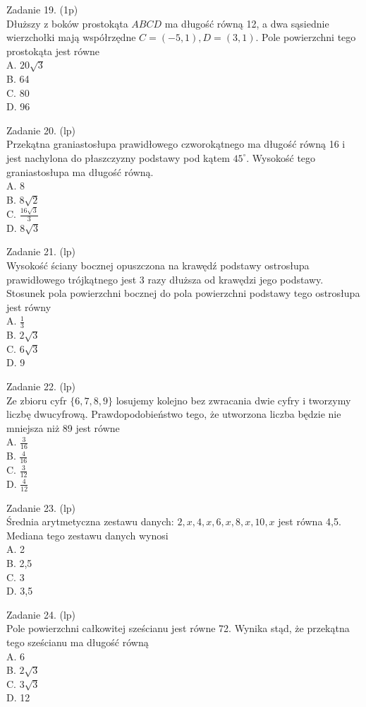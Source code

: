 \documentclass[10pt]{article}
\begin{document}
Zadanie 19. (1p)\\
Dłuższy z boków prostokąta \(A B C D\) ma długość równą 12, a dwa sąsiednie wierzchołki mają współrzędne \(C=(-5,1), D=(3,1)\). Pole powierzchni tego prostokąta jest równe\\
A. \(20 \sqrt{3}\)\\
B. 64\\
C. 80\\
D. 96

Zadanie 20. (lp)\\
Przekątna graniastosłupa prawidłowego czworokątnego ma długość równą 16 i jest nachylona do płaszczyzny podstawy pod kątem \(45^{\circ}\). Wysokość tego graniastosłupa ma długość równą.\\
A. 8\\
B. \(8 \sqrt{2}\)\\
C. \(\frac{16 \sqrt{3}}{3}\)\\
D. \(8 \sqrt{3}\)

Zadanie 21. (lp)\\
Wysokość ściany bocznej opuszczona na krawędź podstawy ostrosłupa prawidłowego trójkątnego jest 3 razy dłuższa od krawędzi jego podstawy. Stosunek pola powierzchni bocznej do pola powierzchni podstawy tego ostrosłupa jest równy\\
A. \(\frac{1}{3}\)\\
B. \(2 \sqrt{3}\)\\
C. \(6 \sqrt{3}\)\\
D. 9

Zadanie 22. (lp)\\
Ze zbioru cyfr \(\{6,7,8,9\}\) losujemy kolejno bez zwracania dwie cyfry i tworzymy liczbę dwucyfrową. Prawdopodobieństwo tego, że utworzona liczba będzie nie mniejsza niż 89 jest równe\\
A. \(\frac{3}{16}\)\\
B. \(\frac{4}{16}\)\\
C. \(\frac{3}{12}\)\\
D. \(\frac{4}{12}\)

Zadanie 23. (lp)\\
Średnia arytmetyczna zestawu danych: \(2, x, 4, x, 6, x, 8, x, 10, x\) jest równa 4,5. Mediana tego zestawu danych wynosi\\
A. 2\\
B. 2,5\\
C. 3\\
D. 3,5

Zadanie 24. (lp)\\
Pole powierzchni całkowitej sześcianu jest równe 72. Wynika stąd, że przekątna tego sześcianu ma długość równą\\
A. 6\\
B. \(2 \sqrt{3}\)\\
C. \(3 \sqrt{3}\)\\
D. 12
\end{document}
